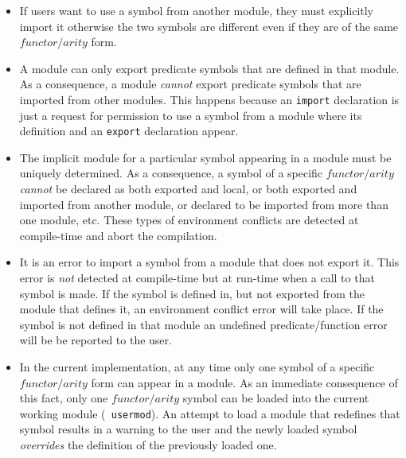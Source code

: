 \begin{itemize}
\item   If users want to use a symbol from another module, they must
        explicitly import it otherwise the two symbols are different
        even if they are of the same $functor/arity$ form.
\item	A module can only export predicate symbols that are defined in
        that module.  As a consequence, a module {\em cannot} export
        predicate symbols that are imported from other modules.
        This happens because an {\tt import} declaration is just a
        request for permission to use a symbol from a module where
        its definition and an {\tt export} declaration appear.
\item   The implicit module for a particular symbol appearing in a
        module must be uniquely determined.  As a consequence, a
        symbol of a specific $functor/arity$ {\em cannot} be declared
        as both exported and local, or both exported and imported from
        another module, or declared to be imported from more than one
        module, etc.  These types of environment conflicts are
        detected at compile-time and abort the compilation.
\item   It is an error to import a symbol from a module that does not
        export it.  This error is {\em not\/} detected at compile-time
        but at run-time when a call to that symbol is made.  If the
        symbol is defined in, but not exported from the module that
	defines it, an environment conflict error will take place.
	If the symbol is not defined in that module an undefined
	predicate/function error will be be reported to the user.
\item   In the current implementation, at any time only one symbol of
        a specific $functor/arity$ form can appear in a module.  As an
        immediate consequence of this fact, only one $functor/arity$
        symbol can be loaded into the current working module ({\tt
        usermod}).  An attempt to load a module that redefines that
        symbol results in a warning to the user and the newly loaded
        symbol {\em overrides} the definition of the previously loaded
        one.
\end{itemize}

